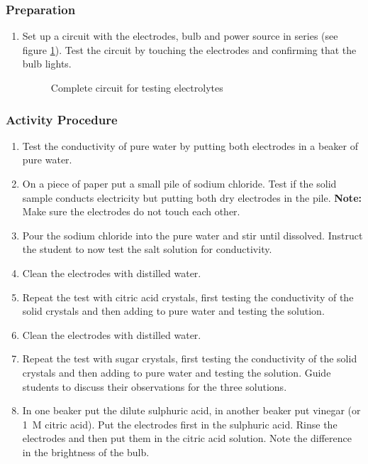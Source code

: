 \subsubsection*{Preparation}
\begin{enumerate}
\item{Set up a circuit with the electrodes, bulb and power source in series (see figure \ref{electrolyte-circuit}). Test the circuit by touching the electrodes and confirming that the bulb lights.}
\begin{figure}[h]
\begin{center}
\def\svgwidth{150pt}

\caption{Complete circuit for testing electrolytes}
\label{electrolyte-circuit}
\end{center}
\end{figure}
\end{enumerate}

\subsubsection*{Activity Procedure}
\begin{enumerate}

\item{Test the conductivity of pure water by putting both electrodes in a beaker of pure water.}
\item{On a piece of paper put a small pile of sodium chloride. Test if the solid sample conducts electricity but putting both dry electrodes in the pile. \textbf{Note:} Make sure the electrodes do not touch each other.}
\item{Pour the sodium chloride into the pure water and stir until dissolved. Instruct the student to now test the salt solution for conductivity.}
\item{Clean the electrodes with distilled water.}
\item{Repeat the test with citric acid crystals, first testing the conductivity of the solid crystals and then adding to pure water and testing the solution.}
\item{Clean the electrodes with distilled water.}
\item{Repeat the test with sugar crystals, first testing the conductivity of the solid crystals and then adding to pure water and testing the solution. Guide students to discuss their observations for the three solutions.}
\item{In one beaker put the dilute sulphuric acid, in another beaker put vinegar (or 1~M citric acid). Put the electrodes first in the sulphuric acid. Rinse the electrodes and then put them in the citric acid solution. Note the difference in the brightness of the bulb.}
\end{enumerate}

